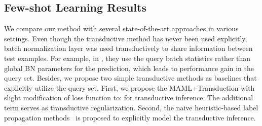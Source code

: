\documentclass{article} \usepackage{iclr2019_conference,times}
\begin{document}
\subsection{Few-shot Learning Results}





We compare our method with several state-of-the-art approaches in various settings. Even though the transductive method has never been used explicitly, batch normalization layer was used transductively to share information between test examples. For example, in \cite{maml,first-order}, they use the query batch statistics rather than global BN parameters for the prediction, which leads to performance gain in the query set. 
Besides, we propose two simple transductive methods as baselines that explicitly utilize the query set. First, we propose the MAML+Transduction with slight modification of loss function to:  for transductive inference. The additional term serves as transductive regularization. Second, the naive heuristic-based label propagation methods~\citep{labelprop1} is proposed to explicitly model the transductive inference.  
\end{document}
